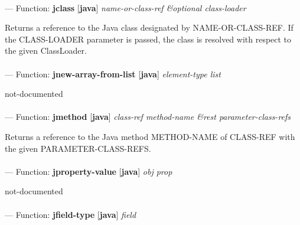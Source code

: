 \paragraph{}
\label{JAVA:JCLASS}
--- Function: \textbf{jclass} [\textbf{java}] \textit{name-or-class-ref \&optional class-loader}

\begin{adjustwidth}{5em}{5em}
Returns a reference to the Java class designated by NAME-OR-CLASS-REF. If the CLASS-LOADER parameter is passed, the class is resolved with respect to the given ClassLoader.
\end{adjustwidth}

\paragraph{}
\label{JAVA:JNEW-ARRAY-FROM-LIST}
--- Function: \textbf{jnew-array-from-list} [\textbf{java}] \textit{element-type list}

\begin{adjustwidth}{5em}{5em}
not-documented
\end{adjustwidth}

\paragraph{}
\label{JAVA:JMETHOD}
--- Function: \textbf{jmethod} [\textbf{java}] \textit{class-ref method-name \&rest parameter-class-refs}

\begin{adjustwidth}{5em}{5em}
Returns a reference to the Java method METHOD-NAME of CLASS-REF with the given PARAMETER-CLASS-REFS.
\end{adjustwidth}

\paragraph{}
\label{JAVA:JPROPERTY-VALUE}
--- Function: \textbf{jproperty-value} [\textbf{java}] \textit{obj prop}

\begin{adjustwidth}{5em}{5em}
not-documented
\end{adjustwidth}

\paragraph{}
\label{JAVA:JFIELD-TYPE}
--- Function: \textbf{jfield-type} [\textbf{java}] \textit{field}

